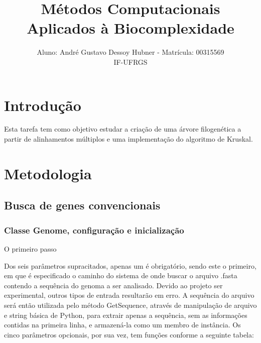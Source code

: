 \documentclass[brazilian,12pt,a4paper,final]{article}
\title{Métodos Computacionais Aplicados à Biocomplexidade}
\author{Aluno: André Gustavo Dessoy Hubner - Matrícula: 00315569 \\ IF-UFRGS}
\begin{document}
	\maketitle
	
	\section{Introdu\c{c}\~ao} 
	\indent 
	Esta tarefa tem como objetivo estudar a criação de uma árvore filogenética a partir de alinhamentos múltiplos e uma implementação do algoritmo de Kruskal.
	
	\section{Metodologia}
	\subsection{Busca de genes convencionais}
	\subsubsection{Classe Genome, configuração e inicialização}
	O primeiro passo 
	
	\vspace{0.5cm}
	
	Dos seis parâmetros supracitados, apenas um é obrigatório, sendo este o primeiro, em que é especificado o caminho
	do sistema de onde buscar o arquivo .fasta contendo a sequência do genoma a ser analisado. Devido ao projeto ser
	experimental, outros tipos de entrada resultarão em erro. A sequência do arquivo será então utilizada pelo método
	GetSequence, através de manipulação de arquivo e string básica de Python, para extrair apenas a sequência, sem as informações
	contidas na primeira linha, e armazená-la como um membro de instância. Os cinco parâmetros opcionais, por sua vez, tem funções 
	conforme a seguinte tabela:
	
	\vspace{0.5cm}
	
\end{document}
